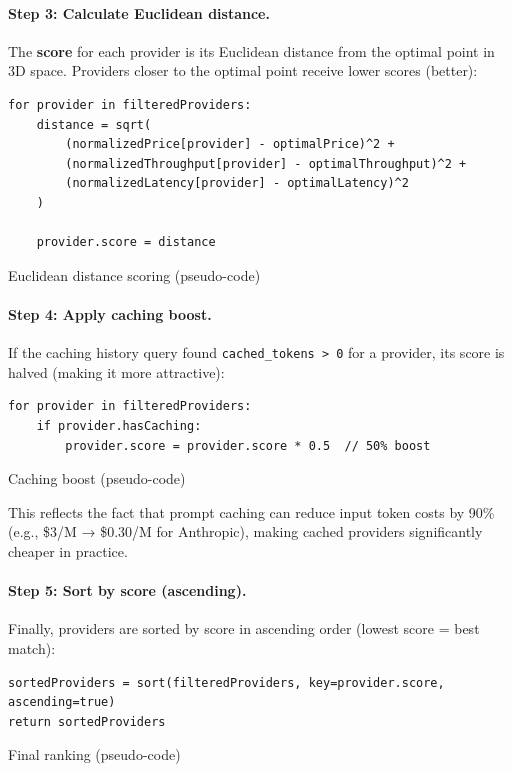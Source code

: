 \documentclass[english]{article}
\begin{document}
\paragraph{Step 3: Calculate Euclidean distance.}

The \textbf{score} for each provider is its Euclidean distance from the optimal point in 3D space. Providers closer to the optimal point receive lower scores (better):

\begin{listing}[H]
\begin{verbatim}
for provider in filteredProviders:
    distance = sqrt(
        (normalizedPrice[provider] - optimalPrice)^2 +
        (normalizedThroughput[provider] - optimalThroughput)^2 +
        (normalizedLatency[provider] - optimalLatency)^2
    )

    provider.score = distance
\end{verbatim}
\caption{Euclidean distance scoring (pseudo-code)}
\end{listing}

\paragraph{Step 4: Apply caching boost.}

If the caching history query found \texttt{cached\_tokens > 0} for a provider, its score is halved (making it more attractive):

\begin{listing}[H]
\begin{verbatim}
for provider in filteredProviders:
    if provider.hasCaching:
        provider.score = provider.score * 0.5  // 50% boost
\end{verbatim}
\caption{Caching boost (pseudo-code)}
\end{listing}

This reflects the fact that prompt caching can reduce input token costs by 90\% (e.g., \$3/M → \$0.30/M for Anthropic), making cached providers significantly cheaper in practice.

\paragraph{Step 5: Sort by score (ascending).}

Finally, providers are sorted by score in ascending order (lowest score = best match):

\begin{listing}[H]
\begin{verbatim}
sortedProviders = sort(filteredProviders, key=provider.score, ascending=true)
return sortedProviders
\end{verbatim}
\caption{Final ranking (pseudo-code)}
\end{listing}
\end{document}
